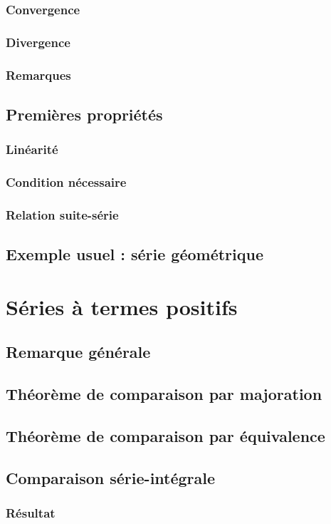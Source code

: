 \documentclass[12pt,a4paper,french]{book}
\begin{document}
			\subsubsection{Convergence}
			\subsubsection{Divergence}
			\subsubsection{Remarques}
		\subsection{Premières propriétés}
			\subsubsection{Linéarité}
			\subsubsection{Condition nécessaire}
			\subsubsection{Relation suite-série}
		\subsection{Exemple usuel : série géométrique}
	\section{Séries à termes positifs}
		\subsection{Remarque générale}
		\subsection{Théorème de comparaison par majoration}
		\subsection{Théorème de comparaison par équivalence}
		\subsection{Comparaison série-intégrale}
			\subsubsection{Résultat}
\end{document}
